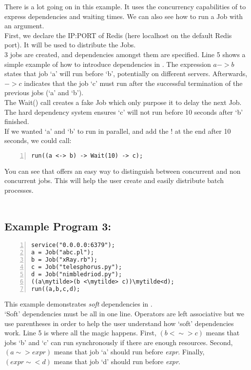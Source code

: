 There is a lot going on in this example. It uses the concurrency capabilities
of \lang{} to express dependencies and
waiting times. We can also see how to run a Job with an argument.\\
First, we declare the IP:PORT of Redis (here localhost on the default Redis
port). It will be used to
distribute the Jobs.\\
3 jobs are created, and dependencies amongst them are specified.
Line 5 shows a simple example of how to introduce dependencies in \lang{}.
The expression $a -> b$ states that job `a' will run before `b', potentially
on different servers. Afterwards,  $-> c$ indicates that the job `c' must run
after the
successful termination of the previous jobs (`a' and `b').\\
The Wait() call creates a fake Job which only purpose it to delay the next Job.
The hard dependency system
ensures `c' will not run before 10 seconds after `b' finished.\\
If we wanted `a' and `b' to run in parallel, and add the ! at the end after 10
seconds, we could call:
\begin{Verbatim}[numbers=left]
run((a <-> b) -> Wait(10) -> c);
\end{Verbatim}

You can see that \lang{} offers an easy way to distinguish between
concurrent and non concurrent jobs. This will help the user create and easily
distribute batch processes.\\
\\

\subsection*{Example Program 3:}
\begin{Verbatim}[numbers=left,commandchars=\\\{\}]
service("0.0.0.0:6379");
a = Job("abc.pl");
b = Job("xRay.rb");
c = Job("telesphorus.py");
d = Job("nimbledriod.py");
((a\mytilde>(b <\mytilde> c))\mytilde<d);
run((a,b,c,d);
\end{Verbatim}

This example demonstrates {\em soft} dependencies in \lang{}.\\
`Soft' dependencies must be all in one line. Operators
are left associative but we use parentheses in order to help
the user understand how `soft' dependencies work. Line 5 is where all the
magic happens. First, $(b <\sim> c)$ means that jobs `b' and `c' can run 
synchronously if there are enough resources. Second,
$(a\sim>expr)$ means that job `a' should run before \textit{expr}. 
Finally, $(expr\sim<d)$ means that job `d' should run before \textit{expr}.\\
\\

